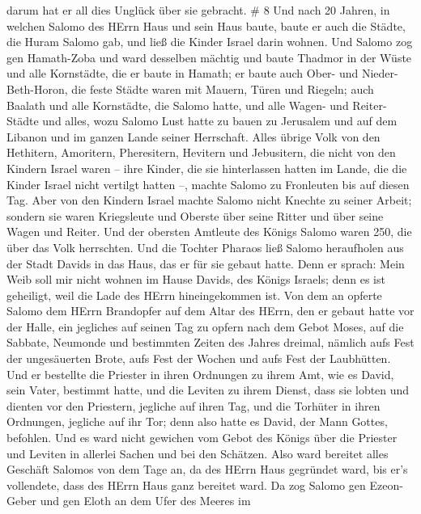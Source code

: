 darum hat er all dies Unglück über sie gebracht. \# 8  Und
nach 20 Jahren, in welchen Salomo des HErrn Haus und sein Haus baute,
 baute er auch die Städte, die Huram Salomo gab, und ließ
die Kinder Israel darin wohnen.  Und Salomo zog gen
Hamath-Zoba und ward desselben mächtig  und baute Thadmor in
der Wüste und alle Kornstädte, die er baute in Hamath;  er
baute auch Ober- und Nieder-Beth-Horon, die feste Städte waren mit
Mauern, Türen und Riegeln;  auch Baalath und alle
Kornstädte, die Salomo hatte, und alle Wagen- und Reiter-Städte und
alles, wozu Salomo Lust hatte zu bauen zu Jerusalem und auf dem Libanon
und im ganzen Lande seiner Herrschaft.  Alles übrige Volk
von den Hethitern, Amoritern, Pheresitern, Hevitern und Jebusitern, die
nicht von den Kindern Israel waren --  ihre Kinder, die sie
hinterlassen hatten im Lande, die die Kinder Israel nicht vertilgt
hatten --, machte Salomo zu Fronleuten bis auf diesen Tag. 
Aber von den Kindern Israel machte Salomo nicht Knechte zu seiner
Arbeit; sondern sie waren Kriegsleute und Oberste über seine Ritter und
über seine Wagen und Reiter.  Und der obersten Amtleute des
Königs Salomo waren 250, die über das Volk herrschten.  Und
die Tochter Pharaos ließ Salomo heraufholen aus der Stadt Davids in das
Haus, das er für sie gebaut hatte. Denn er sprach: Mein Weib soll mir
nicht wohnen im Hause Davids, des Königs Israels; denn es ist geheiligt,
weil die Lade des HErrn hineingekommen ist.  Von dem an
opferte Salomo dem HErrn Brandopfer auf dem Altar des HErrn, den er
gebaut hatte vor der Halle,  ein jegliches auf seinen Tag
zu opfern nach dem Gebot Moses, auf die Sabbate, Neumonde und bestimmten
Zeiten des Jahres dreimal, nämlich aufs Fest der ungesäuerten Brote,
aufs Fest der Wochen und aufs Fest der Laubhütten.  Und er
bestellte die Priester in ihren Ordnungen zu ihrem Amt, wie es David,
sein Vater, bestimmt hatte, und die Leviten zu ihrem Dienst, dass sie
lobten und dienten vor den Priestern, jegliche auf ihren Tag, und die
Torhüter in ihren Ordnungen, jegliche auf ihr Tor; denn also hatte es
David, der Mann Gottes, befohlen.  Und es ward nicht
gewichen vom Gebot des Königs über die Priester und Leviten in allerlei
Sachen und bei den Schätzen.  Also ward bereitet alles
Geschäft Salomos von dem Tage an, da des HErrn Haus gegründet ward, bis
er's vollendete, dass des HErrn Haus ganz bereitet ward. 
Da zog Salomo gen Ezeon-Geber und gen Eloth an dem Ufer des Meeres im
